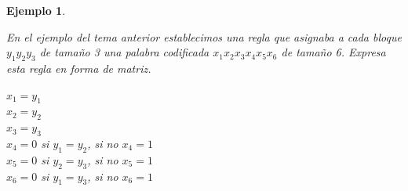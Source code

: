 \documentclass{beamer}
\theoremstyle{plain}
\theoremstyle{example}
\theoremstyle{example}
\newtheorem{ejemplo} [Ejemplo] {Ejemplo}
\begin{document}
\begin{frame}  \footnotesize

\begin{ejemplo} \label{ej:bloqueCodigo2}

En el ejemplo del tema anterior establecimos una regla que asignaba a cada bloque $y_1y_2y_3$ de tamaño 3 una palabra codificada $x_1x_2x_3x_4x_5x_6$ de tamaño 6. Expresa esta regla en forma de matriz.

\begin{center}
$x_1 = y_1$\\
$x_2 = y_2$\\
$x_3 = y_3$\\
$x_4 =0$ si $y_1 =y_2$, si no $x_4 =1$\\
$x_5 =0$ si $y_2 =y_3$, si no $x_5 =1$\\
$x_6 =0$ si $y_1 =y_3$, si no $x_6 =1$\\
\end{center}

\end{ejemplo}
\end{frame} 
\end{document}
